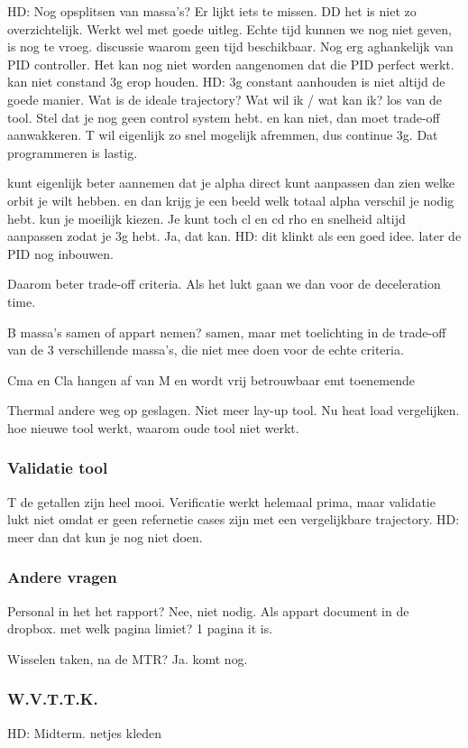 HD: Nog opsplitsen van massa's? Er lijkt iets te missen. DD het is niet zo overzichtelijk. Werkt wel met goede uitleg. Echte tijd kunnen we nog niet geven, is nog te vroeg. discussie waarom geen tijd beschikbaar. Nog erg aghankelijk van PID controller. Het kan nog niet worden aangenomen dat die PID perfect werkt. kan niet constand 3g erop houden. HD: 3g constant aanhouden is niet altijd de goede manier. Wat is de ideale trajectory? Wat wil ik / wat kan ik? los van de tool. Stel dat je nog geen control system hebt. en kan niet, dan moet trade-off aanwakkeren. T wil eigenlijk zo snel mogelijk afremmen, dus continue 3g. Dat programmeren is lastig. 

kunt eigenlijk beter aannemen dat je alpha direct kunt aanpassen dan zien welke orbit je wilt hebben. en dan krijg je een beeld welk totaal alpha verschil je nodig hebt. kun je moeilijk kiezen. Je kunt toch cl en cd rho en snelheid altijd aanpassen zodat je 3g hebt. Ja, dat kan. HD: dit klinkt als een goed idee. later de PID nog inbouwen.

Daarom beter trade-off criteria. Als het lukt gaan we dan voor de deceleration time. 


B massa's samen of appart nemen? samen, maar met toelichting in de trade-off van de 3 verschillende massa's, die niet mee doen voor de echte criteria.


Cma en Cla hangen af van M en wordt vrij betrouwbaar emt toenemende 


Thermal andere weg op geslagen. Niet meer lay-up tool. Nu heat load vergelijken. hoe nieuwe tool werkt, waarom oude tool niet werkt.


\subsubsection{Validatie tool}
T de getallen zijn heel mooi. Verificatie werkt helemaal prima, maar validatie lukt niet omdat er geen refernetie cases zijn met een vergelijkbare trajectory. HD: meer dan dat kun je nog niet doen. 

\subsubsection{Andere vragen}
Personal in het het rapport? Nee, niet nodig. Als appart document in de dropbox. met welk pagina limiet? 1 pagina it is.

Wisselen taken, na de MTR? Ja. komt nog.

\subsubsection{W.V.T.T.K.}
HD: Midterm. netjes kleden

